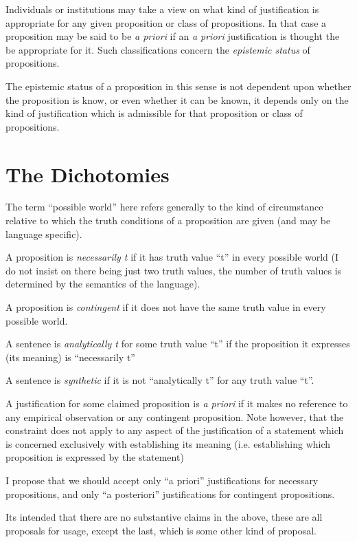 {Individuals or institutions may take a view on what kind of justification is appropriate for any given proposition or class of propositions.
In that case a proposition may be said to be {\it a priori} if an {\it a priori} justification is thought the be appropriate for it.
Such classifications concern the {\it epistemic status} of propositions.

The epistemic status of a proposition in this sense is not dependent upon whether the proposition is know, or even whether it can be known, it depends only on the kind of justification which is admissible for that proposition or class of propositions.

\section{The Dichotomies}

The term ``possible world'' here refers generally to the kind of circumstance relative to which the truth conditions of a proposition are given (and may be language specific).

A proposition is {\it necessarily t} if it has truth value ``t'' in every possible world (I do not insist on there being just two truth values, the number of truth values is determined by the semantics of the language).

A proposition is {\it contingent} if it does not have the same truth value in every possible world.

A sentence is {\it analytically t} for some truth value ``t''	if the proposition it expresses (its meaning) is ``necessarily t''

A sentence is {\it synthetic} if it is not ``analytically t'' for any truth value ``t''.

A justification for some claimed proposition is {\it a priori} if it makes no reference to any empirical observation or any contingent proposition.
Note however, that the constraint does not apply to any aspect of the justification of a statement	which is concerned exclusively with establishing its meaning (i.e. establishing which proposition is expressed by the statement)

I propose that we should accept only ``a priori'' justifications for necessary propositions, and only ``a posteriori'' justifications for contingent propositions.

Its intended that there are no substantive claims in the above, these
are all proposals for usage, except the last, which is some other
kind of proposal.

}
